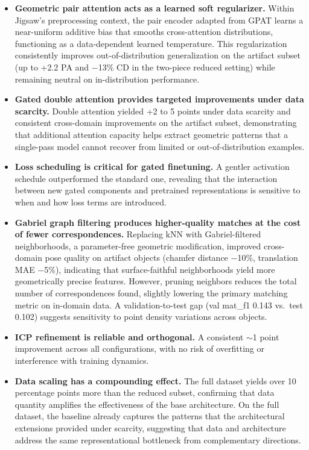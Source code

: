 \begin{itemize}
    \item \textbf{Geometric pair attention acts as a learned soft regularizer.} Within Jigsaw's preprocessing context, the pair encoder adapted from GPAT learns a near-uniform additive bias that smooths cross-attention distributions, functioning as a data-dependent learned temperature. This regularization consistently improves out-of-distribution generalization on the artifact subset (up to +2.2 PA and $-$13\% CD in the two-piece reduced setting) while remaining neutral on in-distribution performance.

    \item \textbf{Gated double attention provides targeted improvements under data scarcity.} Double attention yielded +2 to 5 points under data scarcity and consistent cross-domain improvements on the artifact subset, demonstrating that additional attention capacity helps extract geometric patterns that a single-pass model cannot recover from limited or out-of-distribution examples.

    \item \textbf{Loss scheduling is critical for gated finetuning.} A gentler activation schedule outperformed the standard one, revealing that the interaction between new gated components and pretrained representations is sensitive to when and how loss terms are introduced.

    \item \textbf{Gabriel graph filtering produces higher-quality matches at the cost of fewer correspondences.} Replacing kNN with Gabriel-filtered neighborhoods, a parameter-free geometric modification, improved cross-domain pose quality on artifact objects (chamfer distance $-$10\%, translation MAE $-$5\%), indicating that surface-faithful neighborhoods yield more geometrically precise features. However, pruning neighbors reduces the total number of correspondences found, slightly lowering the primary matching metric on in-domain data. A validation-to-test gap (val mat\_f1 0.143 vs.\ test 0.102) suggests sensitivity to point density variations across objects.

    \item \textbf{ICP refinement is reliable and orthogonal.} A consistent $\sim$1 point improvement across all configurations, with no risk of overfitting or interference with training dynamics.

    \item \textbf{Data scaling has a compounding effect.} The full dataset yields over 10 percentage points more than the reduced subset, confirming that data quantity amplifies the effectiveness of the base architecture. On the full dataset, the baseline already captures the patterns that the architectural extensions provided under scarcity, suggesting that data and architecture address the same representational bottleneck from complementary directions.
\end{itemize}

